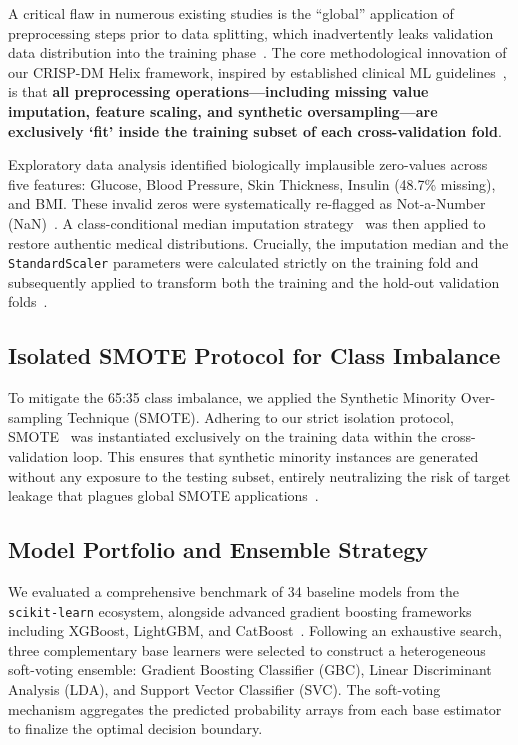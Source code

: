 \documentclass[3p,twocolumn]{elsarticle}
\begin{document}
A critical flaw in numerous existing studies is the ``global'' application of preprocessing steps prior to data splitting, which inadvertently leaks validation data distribution into the training phase~\cite{Kapoor2024Leakage}. The core methodological innovation of our CRISP-DM Helix framework, inspired by established clinical ML guidelines~\cite{Collins2015TRIPOD, Norgeot2020MI-CLAIM}, is that \textbf{all preprocessing operations---including missing value imputation, feature scaling, and synthetic oversampling---are exclusively `fit' inside the training subset of each cross-validation fold}.

Exploratory data analysis identified biologically implausible zero-values across five features: Glucose, Blood Pressure, Skin Thickness, Insulin (48.7\% missing), and BMI. These invalid zeros were systematically re-flagged as Not-a-Number (NaN)~\cite{Kapoor2024Leakage}. A class-conditional median imputation strategy~\cite{Stekhoven2012missForest, Stiglic2012Missing} was then applied to restore authentic medical distributions. Crucially, the imputation median and the \texttt{StandardScaler} parameters were calculated strictly on the training fold and subsequently applied to transform both the training and the hold-out validation folds~\cite{Kapoor2024Leakage}.

\subsection{Isolated SMOTE Protocol for Class Imbalance}

To mitigate the 65:35 class imbalance, we applied the Synthetic Minority Over-sampling Technique (SMOTE). Adhering to our strict isolation protocol, SMOTE~\cite{Batista2004SMOTE, Blagus2013SMOTE} was instantiated exclusively on the training data within the cross-validation loop. This ensures that synthetic minority instances are generated without any exposure to the testing subset, entirely neutralizing the risk of target leakage that plagues global SMOTE applications~\cite{Kapoor2024Leakage}.

\subsection{Model Portfolio and Ensemble Strategy}

We evaluated a comprehensive benchmark of 34 baseline models from the \texttt{scikit-learn} ecosystem, alongside advanced gradient boosting frameworks including XGBoost, LightGBM, and CatBoost~\cite{Kapoor2024Leakage}. Following an exhaustive search, three complementary base learners were selected to construct a heterogeneous soft-voting ensemble: Gradient Boosting Classifier (GBC), Linear Discriminant Analysis (LDA), and Support Vector Classifier (SVC). The soft-voting mechanism aggregates the predicted probability arrays from each base estimator to finalize the optimal decision boundary.
\end{document}
